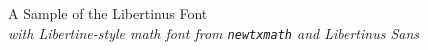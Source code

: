 \documentclass[11pt]{article}
\begin{document}
{\LARGE \noindent A Sample of the Libertinus Font}\\

{\large \noindent \textit{with Libertine-style math font from \texttt{newtxmath} and Libertinus Sans}}\\[5pt]


\end{document}
